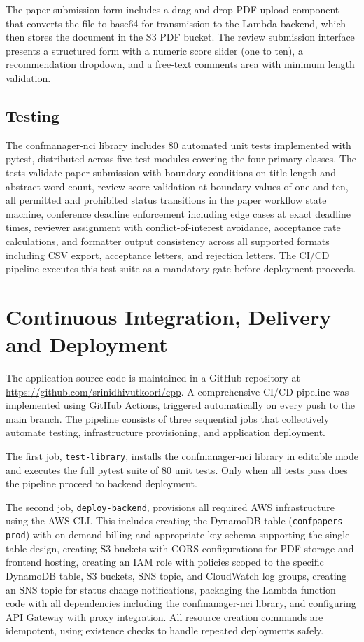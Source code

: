 \documentclass[conference]{IEEEtran}
\begin{document}
The paper submission form includes a drag-and-drop PDF upload component that converts the file to base64 for transmission to the Lambda backend, which then stores the document in the S3 PDF bucket. The review submission interface presents a structured form with a numeric score slider (one to ten), a recommendation dropdown, and a free-text comments area with minimum length validation.

\subsection{Testing}

The confmanager-nci library includes 80 automated unit tests implemented with pytest, distributed across five test modules covering the four primary classes. The tests validate paper submission with boundary conditions on title length and abstract word count, review score validation at boundary values of one and ten, all permitted and prohibited status transitions in the paper workflow state machine, conference deadline enforcement including edge cases at exact deadline times, reviewer assignment with conflict-of-interest avoidance, acceptance rate calculations, and formatter output consistency across all supported formats including CSV export, acceptance letters, and rejection letters. The CI/CD pipeline executes this test suite as a mandatory gate before deployment proceeds.

\section{Continuous Integration, Delivery and Deployment}

The application source code is maintained in a GitHub repository at \url{https://github.com/srinidhivutkoori/cpp}. A comprehensive CI/CD pipeline was implemented using GitHub Actions, triggered automatically on every push to the main branch. The pipeline consists of three sequential jobs that collectively automate testing, infrastructure provisioning, and application deployment.

The first job, \texttt{test-library}, installs the confmanager-nci library in editable mode and executes the full pytest suite of 80 unit tests. Only when all tests pass does the pipeline proceed to backend deployment.

The second job, \texttt{deploy-backend}, provisions all required AWS infrastructure using the AWS CLI. This includes creating the DynamoDB table (\texttt{confpapers-prod}) with on-demand billing and appropriate key schema supporting the single-table design, creating S3 buckets with CORS configurations for PDF storage and frontend hosting, creating an IAM role with policies scoped to the specific DynamoDB table, S3 buckets, SNS topic, and CloudWatch log groups, creating an SNS topic for status change notifications, packaging the Lambda function code with all dependencies including the confmanager-nci library, and configuring API Gateway with proxy integration. All resource creation commands are idempotent, using existence checks to handle repeated deployments safely.
\end{document}
